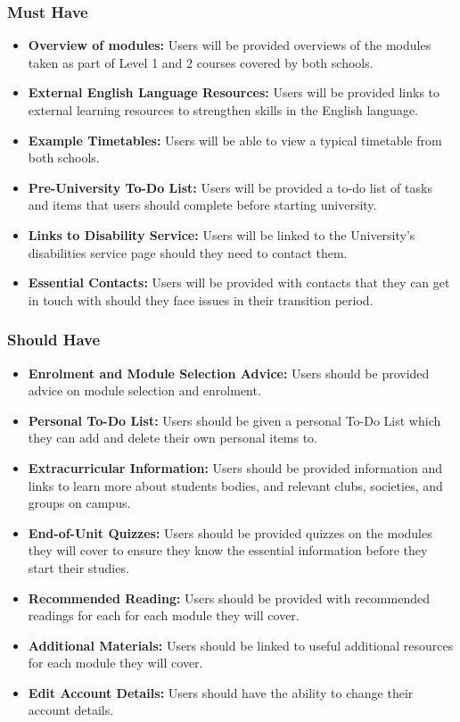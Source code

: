 \documentclass{l4proj}
\begin{document}
\subsubsection{Must Have}
\begin{itemize}
    \item \textbf{Overview of modules:} Users will be provided overviews of the modules taken as part of Level 1 and 2 courses covered by both schools.
    \item \textbf{External English Language Resources:} Users will be provided links to external learning resources to strengthen skills in the English language.
    \item \textbf{Example Timetables:} Users will be able to view a typical timetable from both schools.
    \item \textbf{Pre-University To-Do List:} Users will be provided a to-do list of tasks and items that users should complete before starting university.
    \item \textbf{Links to Disability Service:} Users will be linked to the University's disabilities service page should they need to contact them.
    \item \textbf{Essential Contacts:} Users will be provided with contacts that they can get in touch with should they face issues in their transition period.
\end{itemize}

\subsubsection{Should Have}
\begin{itemize}
    \item \textbf{Enrolment and Module Selection Advice:} Users should be provided advice on module selection and enrolment.
    \item \textbf{Personal To-Do List:} Users should be given a personal To-Do List which they can add and delete their own personal items to.
    \item \textbf{Extracurricular Information:} Users should be provided information and links to learn more about students bodies,  and relevant clubs,  societies,  and groups on campus.
    \item \textbf{End-of-Unit Quizzes:} Users should be provided quizzes on the modules they will cover to ensure they know the essential information before they start their studies.
    \item \textbf{Recommended Reading:} Users should be provided with recommended readings for each for each module they will cover.
    \item \textbf{Additional Materials:} Users should be linked to useful additional resources for each module they will cover.
    \item \textbf{Edit Account Details:} Users should have the ability to change their account details.
\end{itemize}
\end{document}
